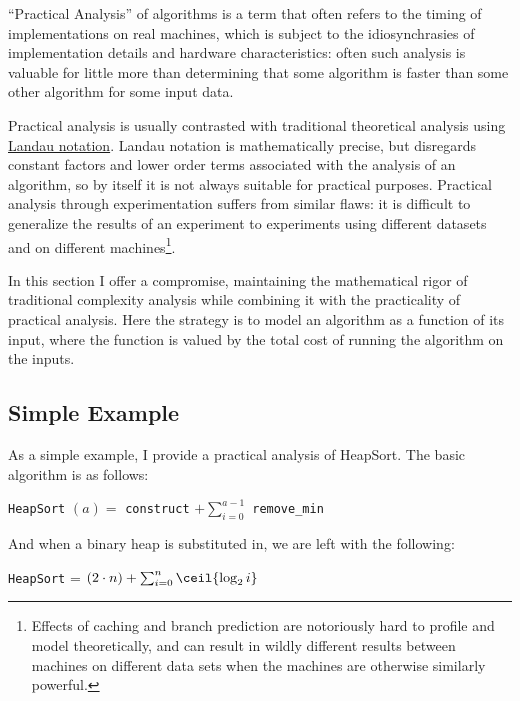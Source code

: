 ``Practical Analysis'' of algorithms is a term that often refers to the timing of implementations on real machines, which is subject to the idiosynchrasies of implementation details and hardware characteristics: often such analysis is valuable for little more than determining that some algorithm is faster than some other algorithm for some input data.  

Practical analysis is usually contrasted with traditional theoretical analysis using \href{http://en.wikipedia.org/wiki/Big\_O\_notation}{Landau notation}.  Landau notation is mathematically precise, but disregards constant factors and lower order terms associated with the analysis of an algorithm, so by itself it is not always suitable for practical purposes.  Practical analysis through experimentation suffers from similar flaws: it is difficult to generalize the results of an experiment to experiments using different datasets and on different machines\footnote{Effects of caching and branch prediction are notoriously hard to profile and model theoretically, and can result in wildly different results between machines on different data sets when the machines are otherwise similarly powerful.}.  

In this section I offer a compromise, maintaining the mathematical rigor of traditional complexity analysis while combining it with the practicality of practical analysis.  Here the strategy is to model an algorithm as a function of its input, where the function is valued by the total cost of running the algorithm on the inputs.

\subsection{Simple Example}

As a simple example, I provide a practical analysis of HeapSort.  The basic algorithm is as follows:

\par
\bigskip

\texttt{HeapSort} $(a) =$ \texttt{construct} $+ \sum_{i = 0}^{a-1}$ \texttt{remove\_min}

\par
\bigskip

And when a binary heap is substituted in, we are left with the following:

\par
\bigskip

\texttt{HeapSort} = $(2 \cdot n) + \sum_{i = 0}^n \ceil{\log_2 i}$

